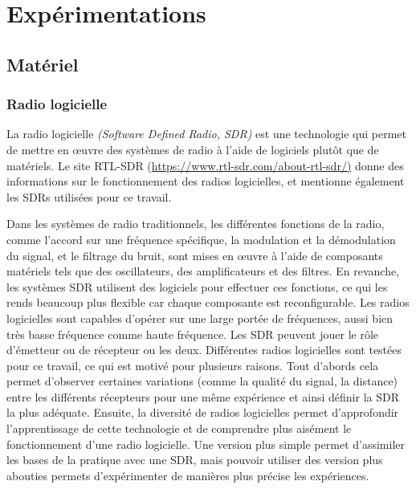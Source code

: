 \chapter{Expérimentations}


\renewcommand{\leftmark}{EXPERIMENTATIONS}

\section{Matériel}

\subsection{Radio logicielle}

La radio logicielle \textit{(Software Defined Radio, SDR)} est une technologie qui permet de mettre en œuvre des systèmes de radio à l'aide de logiciels plutôt que de matériels. Le site RTL-SDR (\href{https://www.rtl-sdr.com/about-rtl-sdr/}{https://www.rtl-sdr.com/about-rtl-sdr/)} donne des informations sur le fonctionnement des radios logicielles, et mentionne également les SDRs utilisées pour ce travail.

\vspace{0.1cm}

Dans les systèmes de radio traditionnels, les différentes fonctions de la radio, comme l'accord sur une fréquence spécifique, la modulation et la démodulation du signal, et le filtrage du bruit, sont mises en œuvre à l'aide de composants matériels tels que des oscillateurs, des amplificateurs et des filtres. En revanche, les systèmes SDR utilisent des logiciels pour effectuer ces fonctions, ce qui les rends beaucoup plus flexible car chaque composante est reconfigurable. Les radios logicielles sont capables d'opérer sur une large portée de fréquences, aussi bien très basse fréquence comme haute fréquence.
Les SDR peuvent jouer le rôle d'émetteur ou de récepteur ou les deux. Différentes radios logicielles sont testées pour ce travail, ce qui est motivé pour plusieurs raisons. Tout d'abords cela permet d'observer certaines variations (comme la qualité du signal, la distance) entre les différents récepteurs pour une même expérience et ainsi définir la SDR la plus adéquate. Ensuite, la diversité de radios logicielles permet d'approfondir l'apprentissage de cette technologie et de comprendre plus aisément le fonctionnement d'une radio logicielle. Une version plus simple permet d'assimiler les bases de la pratique avec une SDR, mais pouvoir utiliser des version plus abouties permets d'expérimenter de manières plus précise les expériences.

